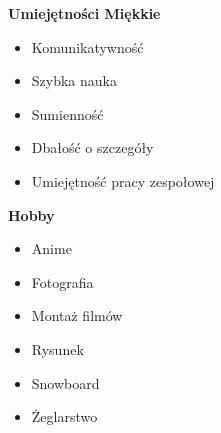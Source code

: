\documentclass[12pt,a4paper]{article}
\begin{document}
\begin{minipage}[t]{0.38\textwidth}
\begin{itemize}[leftmargin=10pt, noitemsep, topsep=1pt]
    \end{itemize}

    \textbf{Umiejętności Miękkie}
    \begin{itemize}[leftmargin=10pt, noitemsep, topsep=1pt]
        \item Komunikatywność
        \item Szybka nauka
        \item Sumienność
        \item Dbałość o szczegóły
        \item Umiejętność pracy zespołowej

    \end{itemize}
    
    \textbf{Hobby}
    \begin{itemize}[leftmargin=10pt, noitemsep, topsep=1pt]
        \item Anime
        \item Fotografia
        \item Montaż filmów
        \item Rysunek
        \item Snowboard
        \item Żeglarstwo
    \end{itemize}
    
    
\end{minipage}
\end{document}
